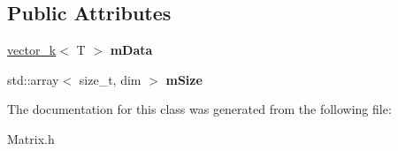 \subsection*{Public Attributes}
\begin{DoxyCompactItemize}
\item 
\hypertarget{classkeycpp_1_1matrix_ab9f011ec2b99ecddf781a89cf780a060}{\hyperlink{classkeycpp_1_1vector__k}{vector\-\_\-k}$<$ T $>$ {\bfseries m\-Data}}\label{classkeycpp_1_1matrix_ab9f011ec2b99ecddf781a89cf780a060}

\item 
\hypertarget{classkeycpp_1_1matrix_afcebe6fce26a54bce1a2ae376501c77e}{std\-::array$<$ size\-\_\-t, dim $>$ {\bfseries m\-Size}}\label{classkeycpp_1_1matrix_afcebe6fce26a54bce1a2ae376501c77e}

\end{DoxyCompactItemize}


The documentation for this class was generated from the following file\-:\begin{DoxyCompactItemize}
\item 
Matrix.\-h\end{DoxyCompactItemize}
